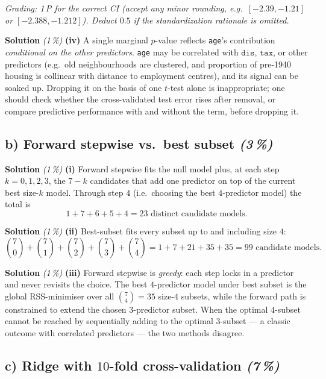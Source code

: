 \documentclass[11pt,a4paper]{article}
\newcommand{\subpoints}[1]{\textit{(#1\,\%)}}
\newcommand{\sol}{\noindent\textbf{Solution}}
\begin{document}
\noindent\emph{Grading: 1\,P for the correct CI (accept any minor rounding, e.g.\ $[-2.39,-1.21]$ or
$[-2.388,-1.212]$). Deduct $0.5$ if the standardization rationale is omitted.}

\medskip
\sol{} \subpoints{1} \textbf{(iv)} A single marginal $p$-value reflects \texttt{age}'s contribution
\emph{conditional on the other predictors}. \texttt{age} may be correlated with $\texttt{dis}$, $\texttt{tax}$,
or other predictors (e.g.\ old neighbourhoods are clustered, and proportion of pre-1940 housing is
collinear with distance to employment centres), and its signal can be soaked up. Dropping it on the basis
of one $t$-test alone is inappropriate; one should check whether the cross-validated test error rises
after removal, or compare predictive performance with and without the term, before dropping it.

\subsection*{b) Forward stepwise vs.\ best subset \subpoints{3}}

\sol{} \subpoints{1} \textbf{(i)} Forward stepwise fits the null model plus, at each step
$k=0,1,2,3$, the $7-k$ candidates that add one predictor on top of the current best size-$k$ model.
Through step $4$ (i.e.\ choosing the best $4$-predictor model) the total is
$$1 + 7 + 6 + 5 + 4 = \boxed{23} \text{ distinct candidate models.}$$

\medskip
\sol{} \subpoints{1} \textbf{(ii)} Best-subset fits every subset up to and including size $4$:
$$\binom{7}{0} + \binom{7}{1} + \binom{7}{2} + \binom{7}{3} + \binom{7}{4}
   = 1 + 7 + 21 + 35 + 35 = \boxed{99} \text{ candidate models.}$$

\medskip
\sol{} \subpoints{1} \textbf{(iii)} Forward stepwise is \emph{greedy}: each step locks in a predictor and
never revisits the choice. The best $4$-predictor model under best subset is the global RSS-minimiser over
all $\binom{7}{4}=35$ size-$4$ subsets, while the forward path is constrained to extend the
chosen $3$-predictor subset. When the optimal $4$-subset cannot be reached by sequentially adding to the
optimal $3$-subset --- a classic outcome with correlated predictors --- the two methods disagree.

\subsection*{c) Ridge with $10$-fold cross-validation \subpoints{7}}
\end{document}

